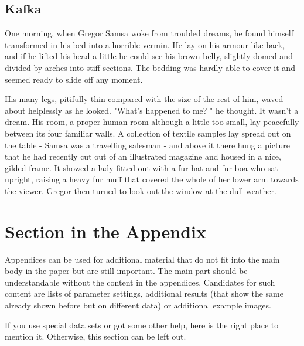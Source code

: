 \documentclass[sigconf]{acmart}
\begin{document}
\subsection{Kafka}
One morning, when Gregor Samsa woke from troubled dreams, he found himself transformed in his bed into a horrible vermin. He lay on his armour-like back, and if he lifted his head a little he could see his brown belly, slightly domed and divided by arches into stiff sections. The bedding was hardly able to cover it and seemed ready to slide off any moment.

His many legs, pitifully thin compared with the size of the rest of him, waved about helplessly as he looked. "What's happened to me? " he thought. It wasn't a dream. His room, a proper human room although a little too small, lay peacefully between its four familiar walls. A collection of textile samples lay spread out on the table - Samsa was a travelling salesman - and above it there hung a picture that he had recently cut out of an illustrated magazine and housed in a nice, gilded frame. It showed a lady fitted out with a fur hat and fur boa who sat upright, raising a heavy fur muff that covered the whole of her lower arm towards the viewer. Gregor then turned to look out the window at the dull weather. 


\appendix
\section{Section in the Appendix}
Appendices can be used for additional material that do not fit into the main body in the paper but are still important. The main part should be understandable without the content in the appendices. Candidates for such content are lists of parameter settings, additional results (that show the same already shown before but on different data) or additional example images.

\begin{acks}
If you use special data sets or got some other help, here is the right place to mention it. Otherwise, this section can be left out.
\end{acks}




\end{document}
